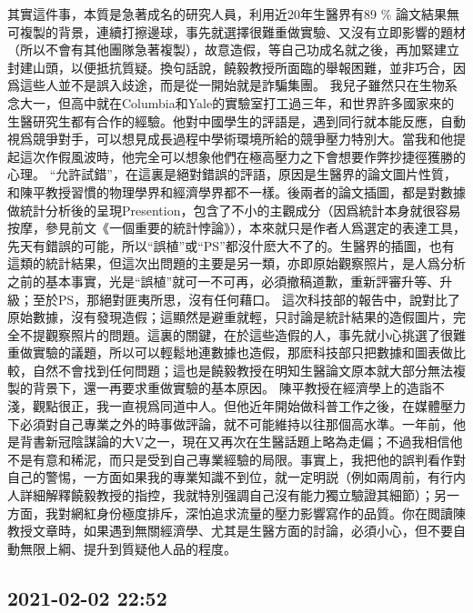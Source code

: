 \documentclass[twocolumn]{ctexart}
\begin{document}
其實這件事，本質是急著成名的研究人員，利用近20年生醫界有89 \% 論文結果無可複製的背景，連續打擦邊球，事先就選擇很難重做實驗、又沒有立即影響的題材（所以不會有其他團隊急著複製），故意造假，等自己功成名就之後，再加緊建立封建山頭，以便抵抗質疑。換句話說，饒毅教授所面臨的舉報困難，並非巧合，因爲這些人並不是誤入歧途，而是從一開始就是詐騙集團。
我兒子雖然只在生物系念大一，但高中就在Columbia和Yale的實驗室打工過三年，和世界許多國家來的生醫研究生都有合作的經驗。他對中國學生的評語是，遇到同行就本能反應，自動視爲競爭對手，可以想見成長過程中學術環境所給的競爭壓力特別大。當我和他提起這次作假風波時，他完全可以想象他們在極高壓力之下會想要作弊抄捷徑獲勝的心理。
“允許試錯”，在這裏是絕對錯誤的評語，原因是生醫界的論文圖片性質，和陳平教授習慣的物理學界和經濟學界都不一樣。後兩者的論文插圖，都是對數據做統計分析後的呈現Presention，包含了不小的主觀成分（因爲統計本身就很容易按摩，參見前文《一個重要的統計悖論》），本來就只是作者人爲選定的表達工具，先天有錯誤的可能，所以“誤植”或“PS”都沒什麽大不了的。生醫界的插圖，也有這類的統計結果，但這次出問題的主要是另一類，亦即原始觀察照片，是人爲分析之前的基本事實，光是“誤植”就可一不可再，必須撤稿道歉，重新評審升等、升級；至於PS，那絕對匪夷所思，沒有任何藉口。
這次科技部的報告中，說對比了原始數據，沒有發現造假；這顯然是避重就輕，只討論是統計結果的造假圖片，完全不提觀察照片的問題。這裏的關鍵，在於這些造假的人，事先就小心挑選了很難重做實驗的議題，所以可以輕鬆地連數據也造假，那麽科技部只把數據和圖表做比較，自然不會找到任何問題；這也是饒毅教授在明知生醫論文原本就大部分無法複製的背景下，還一再要求重做實驗的基本原因。
陳平教授在經濟學上的造詣不淺，觀點很正，我一直視爲同道中人。但他近年開始做科普工作之後，在媒體壓力下必須對自己專業之外的時事做評論，就不可能維持以往那個高水準。一年前，他是背書新冠陰謀論的大V之一，現在又再次在生醫話題上略為走偏；不過我相信他不是有意和稀泥，而只是受到自己專業經驗的局限。事實上，我把他的誤判看作對自己的警惕，一方面如果我的專業知識不到位，就一定明説（例如兩周前，有行内人詳細解釋饒毅教授的指控，我就特別强調自己沒有能力獨立驗證其細節）；另一方面，我對網紅身份極度排斥，深怕追求流量的壓力影響寫作的品質。你在閲讀陳教授文章時，如果遇到無關經濟學、尤其是生醫方面的討論，必須小心，但不要自動無限上綱、提升到質疑他人品的程度。
\subsection*{2021-02-02 22:52}
\end{document}
